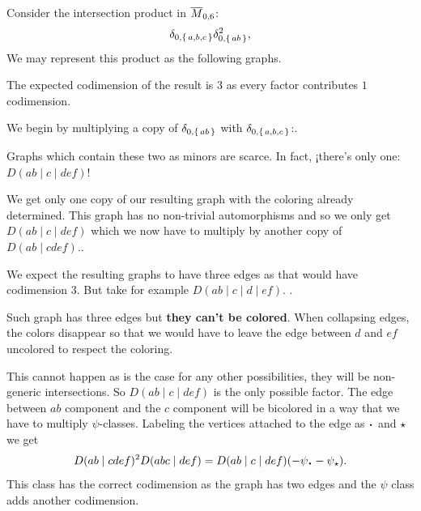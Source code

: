 \documentclass[12pt]{memoir}
\begin{document}
\begin{Ex}
    Consider the intersection product in $\overline{M}_{0,6}$:
    $$\delta_{0,\{\,a,b,c\,\}}\delta_{0,\{\,ab\,\}}^2,$$
    We may represent this product as the following graphs.\par
    The expected codimension of the result is $3$ as every factor contributes $1$ codimension.\par

    We begin by multiplying a copy of $\delta_{0,\{\,ab\,\}}$ with $\delta_{0,\{\,a,b,c\,\}}$:.\par
{}
    Graphs which contain these two as minors are scarce. In fact, ¡there's only one: $D(ab\mid c\mid def)$!\par 

    We get only one copy of our resulting graph with the coloring already determined.
    This graph has no non-trivial automorphisms and so we only get $D(ab\mid c\mid def)$ which we now have to multiply by another copy of $D(ab\mid cdef)$..\par

    We expect the resulting graphs to have three edges as that would have codimension $3$. But take for example $D(ab\mid c\mid d\mid ef)$. .\par
    
    Such graph has three edges but \textbf{they can't be colored}. When collapsing edges, the colors disappear so that we would have to leave the edge between $d$ and $ef$ uncolored to respect the coloring.\par
    This cannot happen as is the case for any other possibilities, they will be non-generic intersections. So $D(ab\mid c\mid def)$ is the only possible factor. The edge between $ab$ component and the $c$ component will be bicolored in a way that we have to multiply $\psi$-classes. Labeling the vertices attached to the edge as $\.$ and $\star$ we get 
    $$D(ab\mid cdef)^2 D(abc\mid def)=D(ab\mid c\mid def)(-\psi_\.-\psi_\star).$$
    This class has the correct codimension as the graph has two edges and the $\psi$ class adds another codimension.
\end{Ex}
\end{document}
